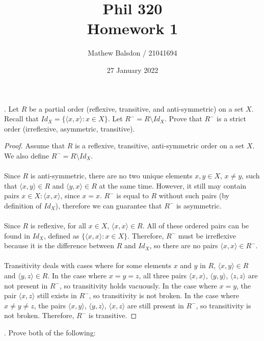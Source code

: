 \documentclass[11pt]{article}
\title{Phil 320\\Homework 1}
\author{Mathew Balsdon / 21041694}
\date{27 January 2022}%
\begin{document}
\maketitle

. Let $R$ be a partial order (reflexive, transitive, and anti-symmetric) on a set $X$. Recall that $Id_X = \{\langle x, x \rangle : x \in X\}$. Let $R^-=R\setminus Id_X$. Prove that $R^-$ is a strict order (irreflexive, asymmetric, transitive). \\

\color{RoyalBlue}
\begin{proof}
Assume that $R$ is a reflexive, transitive, anti-symmetric order on a set $X$. We also define $R^-=R\setminus Id_X$. \\\\
Since $R$ is anti-symmetric, there are no two unique elements $x,y \in X$, $x \neq y$, such that $\langle x, y \rangle \in R$ and $\langle y, x \rangle \in R$ at the same time. However, it still may contain pairs $x \in X: \langle x, x \rangle$, since $x = x$. $R^-$ is equal to $R$ without such pairs (by definition of $Id_X$), therefore we can guarantee that $R^-$ is asymmetric. \\\\
Since $R$ is reflexive, for all $x \in X$, $\langle x, x \rangle \in R$. All of these ordered pairs can be found in $Id_X$, defined as $\{\langle x, x \rangle : x \in X\}$. Therefore, $R^-$ must be irreflexive because it is the difference between $R$ and $Id_X$, so there are no pairs $\langle x, x \rangle \in R^-$. \\\\
Transitivity deals with cases where for some elements $x$ and $y$ in $R$, $\langle x, y \rangle \in R$ and $\langle y, z \rangle \in R$. In the case where $x = y = z$, all three pairs $\langle x, x \rangle$, $\langle y, y \rangle$, $\langle z, z \rangle$ are not present in $R^-$, so transitivity holds vacuously. In the case where $x = y$, the pair $\langle x, z \rangle$ still exists in $R^-$, so transitivity is not broken. In the case where $x \neq y \neq z$, the pairs $\langle x, y \rangle$, $\langle y, z \rangle$, $\langle x, z \rangle$ are still present in $R^-$, so transitivity is not broken. Therefore, $R^-$ is transitive.
\end{proof}
\color{black}


\newpage
{}. Prove both of the following:
\end{document}
